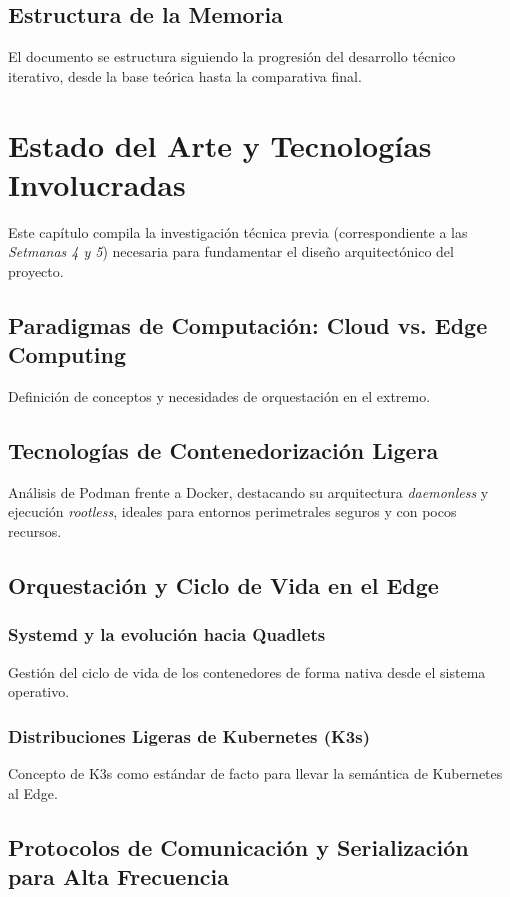 \documentclass[11pt, a4paper]{report}
\begin{document}
\section{Estructura de la Memoria}
El documento se estructura siguiendo la progresión del desarrollo técnico iterativo, desde la base teórica hasta la comparativa final.

\chapter{Estado del Arte y Tecnologías Involucradas}

Este capítulo compila la investigación técnica previa (correspondiente a las \textit{Setmanas 4 y 5}) necesaria para fundamentar el diseño arquitectónico del proyecto.

\section{Paradigmas de Computación: Cloud vs. Edge Computing}
Definición de conceptos y necesidades de orquestación en el extremo.

\section{Tecnologías de Contenedorización Ligera}
Análisis de Podman frente a Docker, destacando su arquitectura \textit{daemonless} y ejecución \textit{rootless}, ideales para entornos perimetrales seguros y con pocos recursos.

\section{Orquestación y Ciclo de Vida en el Edge}
\subsection{Systemd y la evolución hacia Quadlets}
Gestión del ciclo de vida de los contenedores de forma nativa desde el sistema operativo.
\subsection{Distribuciones Ligeras de Kubernetes (K3s)}
Concepto de K3s como estándar de facto para llevar la semántica de Kubernetes al Edge.

\section{Protocolos de Comunicación y Serialización para Alta Frecuencia}
\end{document}
